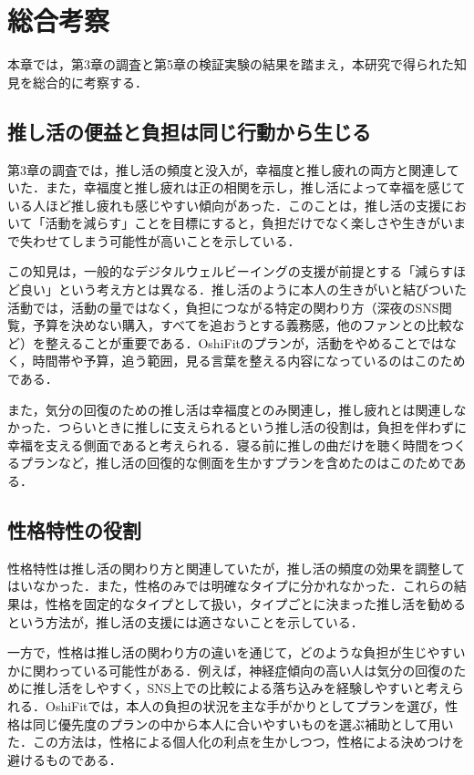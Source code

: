 \chapter{総合考察}
本章では，第3章の調査と第5章の検証実験の結果を踏まえ，本研究で得られた知見を総合的に考察する．

\section{推し活の便益と負担は同じ行動から生じる}
第3章の調査では，推し活の頻度と没入が，幸福度と推し疲れの両方と関連していた．また，幸福度と推し疲れは正の相関を示し，推し活によって幸福を感じている人ほど推し疲れも感じやすい傾向があった．このことは，推し活の支援において「活動を減らす」ことを目標にすると，負担だけでなく楽しさや生きがいまで失わせてしまう可能性が高いことを示している．

この知見は，一般的なデジタルウェルビーイングの支援が前提とする「減らすほど良い」という考え方とは異なる．推し活のように本人の生きがいと結びついた活動では，活動の量ではなく，負担につながる特定の関わり方（深夜のSNS閲覧，予算を決めない購入，すべてを追おうとする義務感，他のファンとの比較など）を整えることが重要である．OshiFitのプランが，活動をやめることではなく，時間帯や予算，追う範囲，見る言葉を整える内容になっているのはこのためである．

また，気分の回復のための推し活は幸福度とのみ関連し，推し疲れとは関連しなかった．つらいときに推しに支えられるという推し活の役割は，負担を伴わずに幸福を支える側面であると考えられる．寝る前に推しの曲だけを聴く時間をつくるプランなど，推し活の回復的な側面を生かすプランを含めたのはこのためである．

\section{性格特性の役割}
性格特性は推し活の関わり方と関連していたが，推し活の頻度の効果を調整してはいなかった．また，性格のみでは明確なタイプに分かれなかった．これらの結果は，性格を固定的なタイプとして扱い，タイプごとに決まった推し活を勧めるという方法が，推し活の支援には適さないことを示している．

一方で，性格は推し活の関わり方の違いを通じて，どのような負担が生じやすいかに関わっている可能性がある．例えば，神経症傾向の高い人は気分の回復のために推し活をしやすく，SNS上での比較による落ち込みを経験しやすいと考えられる．OshiFitでは，本人の負担の状況を主な手がかりとしてプランを選び，性格は同じ優先度のプランの中から本人に合いやすいものを選ぶ補助として用いた．この方法は，性格による個人化の利点を生かしつつ，性格による決めつけを避けるものである．

